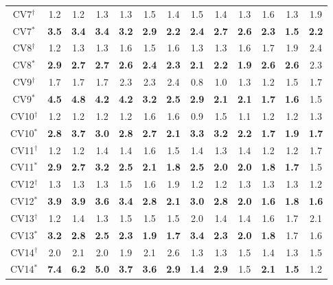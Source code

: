 \begin{table}[]
\begin{threeparttable}
\begin{tabular}{c|cccccc|cccccc}
\hline
CV7$^{\dag}$&1.2 &1.2 &1.3 &1.3 &1.5 &1.4 &1.5 &1.4 &1.3 &1.6 &1.3 &1.9 \\
CV7$^{*}$&\textbf{3.5} &\textbf{3.4} &\textbf{3.4} &\textbf{3.2} &\textbf{2.9} &\textbf{2.2} &\textbf{2.4} &\textbf{2.7} &\textbf{2.6} &\textbf{2.3} &\textbf{1.5} &\textbf{2.2} \\
\hline
CV8$^{\dag}$&1.2 &1.3 &1.3 &1.6 &1.5 &1.6 &1.3 &1.3 &1.6 &1.7 &1.9 &2.4 \\
CV8$^{*}$&\textbf{2.9} &\textbf{2.7} &\textbf{2.7} &\textbf{2.6} &\textbf{2.4} &\textbf{2.3} &\textbf{2.1} &\textbf{2.2} &\textbf{1.9} &\textbf{2.6} &\textbf{2.6} &2.3 \\
\hline
CV9$^{\dag}$&1.7 &1.7 &1.7 &2.3 &2.3 &2.4 &0.8 &1.0 &1.3 &1.2 &1.5 &1.7 \\
CV9$^{*}$&\textbf{4.5} &\textbf{4.8} &\textbf{4.2} &\textbf{4.2} &\textbf{3.2} &\textbf{2.5} &\textbf{2.9} &\textbf{2.1} &\textbf{2.1} &\textbf{1.7} &\textbf{1.6} &1.5 \\
\hline
CV10$^{\dag}$&1.2 &1.2 &1.2 &1.2 &1.6 &1.6 &0.9 &1.5 &1.1 &1.2 &1.2 &1.3 \\
CV10$^{*}$&\textbf{2.8} &\textbf{3.7} &\textbf{3.0} &\textbf{2.8} &\textbf{2.7} &\textbf{2.1} &\textbf{3.3} &\textbf{3.2} &\textbf{2.2} &\textbf{1.7} &\textbf{1.9} &\textbf{1.7} \\
\hline
CV11$^{\dag}$&1.2 &1.2 &1.4 &1.4 &1.6 &1.5 &1.4 &1.3 &1.4 &1.2 &1.2 &1.7 \\
CV11$^{*}$&\textbf{2.9} &\textbf{2.7} &\textbf{3.2} &\textbf{2.5} &\textbf{2.1} &\textbf{1.8} &\textbf{2.5} &\textbf{2.0} &\textbf{2.0} &\textbf{1.8} &\textbf{1.7} &1.5 \\
\hline
CV12$^{\dag}$&1.3 &1.3 &1.3 &1.5 &1.6 &1.9 &1.2 &1.2 &1.3 &1.3 &1.3 &1.2 \\
CV12$^{*}$&\textbf{3.9} &\textbf{3.9} &\textbf{3.6} &\textbf{3.4} &\textbf{2.8} &\textbf{2.1} &\textbf{3.0} &\textbf{2.8} &\textbf{2.0} &\textbf{1.6} &\textbf{1.8} &\textbf{1.6} \\
\hline
CV13$^{\dag}$&1.2 &1.4 &1.3 &1.5 &1.5 &1.5 &2.0 &1.4 &1.4 &1.6 &1.7 &2.1 \\
CV13$^{*}$&\textbf{3.2} &\textbf{2.8} &\textbf{2.5} &\textbf{2.3} &\textbf{1.9} &\textbf{1.7} &\textbf{3.4} &\textbf{2.3} &\textbf{2.0} &\textbf{1.8} &1.7 &1.6 \\
\hline
CV14$^{\dag}$&2.0 &2.1 &2.0 &1.9 &2.1 &2.6 &1.3 &1.3 &1.5 &1.4 &1.3 &1.5 \\
CV14$^{*}$&\textbf{7.4} &\textbf{6.2} &\textbf{5.0} &\textbf{3.7} &\textbf{3.6} &\textbf{2.9} &\textbf{1.4} &\textbf{2.9} &1.5 &\textbf{2.1} &\textbf{1.5} &1.2 \\

\end{tabular}
\end{threeparttable}
\end{table}
